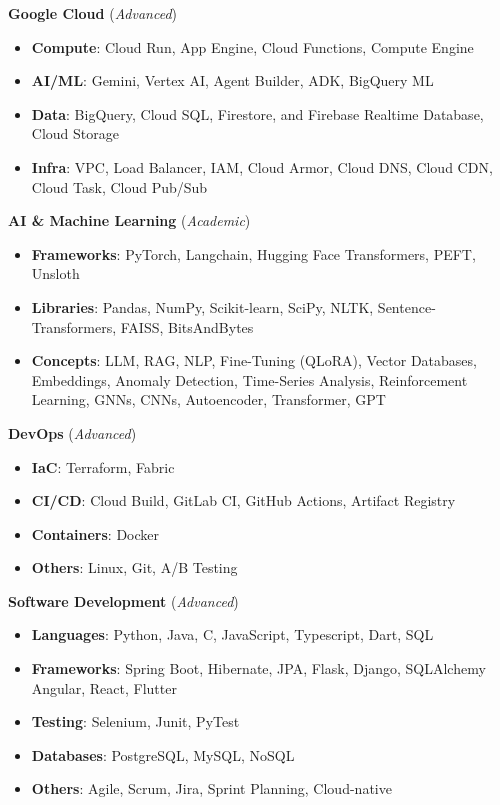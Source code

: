 \documentclass[9pt, a4paper]{article}
\begin{document}
\begin{minipage}[t]{0.32\linewidth}
		{\bfseries Google Cloud} (\textit{Advanced})
		\begin{itemize}[leftmargin=*, nosep, itemsep=2pt]
			\footnotesize
			\item \textbf{Compute}: Cloud Run, App Engine, Cloud Functions, Compute Engine
			\item \textbf{AI/ML}: Gemini, Vertex AI, Agent Builder, ADK, BigQuery ML
			\item \textbf{Data}: BigQuery, Cloud SQL, Firestore, and Firebase Realtime Database, Cloud Storage
			\item \textbf{Infra}: VPC, Load Balancer, IAM, Cloud Armor, Cloud DNS, Cloud CDN, Cloud Task, Cloud Pub/Sub
		\end{itemize}
		\vspace{5pt}
		
		{\bfseries AI \& Machine Learning} (\textit{Academic})
		\begin{itemize}[leftmargin=*, nosep, itemsep=2pt]
			\footnotesize
			\item \textbf{Frameworks}: PyTorch, Langchain, Hugging Face Transformers, PEFT, Unsloth
			\item \textbf{Libraries}: Pandas, NumPy, Scikit-learn, SciPy, NLTK, Sentence-Transformers, FAISS, BitsAndBytes
			\item \textbf{Concepts}: LLM, RAG, NLP, Fine-Tuning (QLoRA), Vector Databases, Embeddings, Anomaly Detection, Time-Series Analysis, Reinforcement Learning, GNNs, CNNs, Autoencoder, Transformer, GPT
		\end{itemize}
		\vspace{5pt}
		
		{\bfseries DevOps} (\textit{Advanced})
		\begin{itemize}[leftmargin=*, nosep, itemsep=2pt]
			\footnotesize
			\item \textbf{IaC}: Terraform, Fabric
			\item \textbf{CI/CD}: Cloud Build, GitLab CI, GitHub Actions, Artifact Registry
			\item \textbf{Containers}: Docker
			\item \textbf{Others}: Linux, Git, A/B Testing
		\end{itemize}
		\vspace{5pt}
		
		{\bfseries Software Development} (\textit{Advanced})
		\begin{itemize}[leftmargin=*, nosep, itemsep=2pt]
			\footnotesize
			\item \textbf{Languages}: Python, Java, C, JavaScript, Typescript, Dart, SQL
			\item \textbf{Frameworks}: Spring Boot, Hibernate, JPA, Flask, Django, SQLAlchemy Angular, React, Flutter
			\item \textbf{Testing}: Selenium, Junit, PyTest
			\item \textbf{Databases}: PostgreSQL, MySQL, NoSQL
			\item \textbf{Others}: Agile, Scrum, Jira, Sprint Planning, Cloud-native
		\end{itemize}
		\vspace{7pt}
		

\end{minipage}
\end{document}
